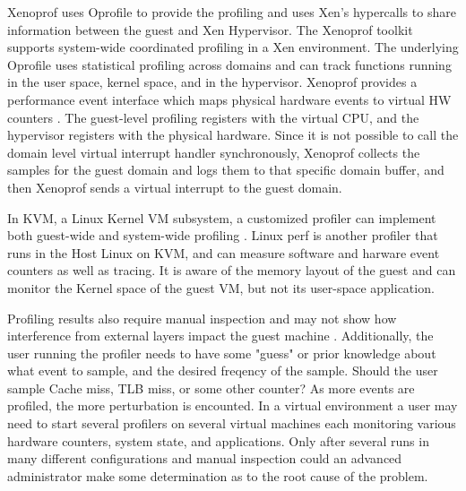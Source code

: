 \indent Xenoprof uses Oprofile to provide the profiling and uses Xen's hypercalls to share information between the guest and Xen Hypervisor.  The Xenoprof toolkit supports system-wide coordinated profiling in a Xen environment.  The underlying Oprofile uses statistical profiling across domains and can track functions running in the user space, kernel space, and in the hypervisor.  Xenoprof provides a performance event interface which maps physical hardware events to virtual HW counters \cite{santos, menon2}.   The guest-level profiling registers with the virtual CPU, and the hypervisor registers with the physical hardware.  Since it is not possible to call the domain level virtual interrupt handler synchronously, Xenoprof collects the samples for the guest domain and logs them to that specific domain buffer, and then Xenoprof sends a virtual interrupt to the guest domain.

\indent In KVM, a Linux Kernel VM subsystem, a customized profiler can implement both guest-wide and system-wide profiling \cite{du2}.  Linux perf is another profiler that runs in the Host Linux on KVM, and can measure software and harware event counters as well as tracing.  It is aware of the memory layout of the guest and can monitor the Kernel space of the guest VM, but not its user-space application. 

\indent Profiling results also require manual inspection and may not show how interference from external layers impact the guest machine \cite{traeger, knapp1}.  Additionally, the user running the profiler needs to have some "guess" or prior knowledge about what event to sample, and the desired freqency of the sample.  Should the user sample Cache miss, TLB miss, or some other counter?  As more events are profiled, the more perturbation is encounted.  In a virtual environment a user may need to start several profilers on several virtual machines each monitoring various hardware counters, system state, and applications.  Only after several runs in many different configurations and manual inspection could an advanced administrator make some determination as to the root cause of the problem. 


